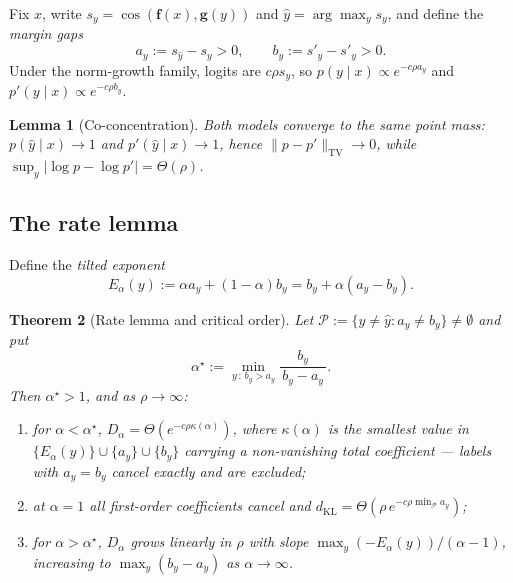 \documentclass[10pt,letterpaper,twocolumn]{article}
\newcommand{\bff}{\mathbf{f}}
\newcommand{\bfg}{\mathbf{g}}
\newcommand{\dKL}{d_{\mathrm{KL}}}
\newcommand{\Dalpha}{D_{\alpha}}
\newcommand{\TV}{\mathrm{TV}}
\theoremstyle{plain}
\newtheorem{theorem}{Theorem}
\newtheorem{lemma}[theorem]{Lemma}
\theoremstyle{definition}
\theoremstyle{remark}
\begin{document}
Fix $x$, write $s_{y}=\cos(\bff(x),\bfg(y))$ and
$\hat y=\arg\max_{y}s_{y}$, and define the \emph{margin gaps}
\begin{equation}
a_{y}:=s_{\hat y}-s_{y}>0,\qquad b_{y}:=s'_{\hat y}-s'_{y}>0 .
\label{eq:gaps}
\end{equation}
Under the norm-growth family, logits are $c\rho s_{y}$, so
$p(y\mid x)\propto e^{-c\rho a_{y}}$ and $p'(y\mid x)\propto e^{-c\rho b_{y}}$.

\begin{lemma}[Co-concentration]
\label{lem:coconc}
Both models converge to the \emph{same} point mass:
$p(\hat y\mid x)\to1$ and $p'(\hat y\mid x)\to1$, hence
$\|p-p'\|_{\TV}\to0$, while
$\sup_{y}|\log p-\log p'|=\Theta(\rho)$.
\end{lemma}

\subsection{The rate lemma}

Define the \emph{tilted exponent}
\begin{equation}
E_{\alpha}(y):=\alpha a_{y}+(1-\alpha)b_{y}=b_{y}+\alpha(a_{y}-b_{y}).
\label{eq:tilted}
\end{equation}

\begin{theorem}[Rate lemma and critical order]
\label{thm:alphastar}
Let $\mathcal{P}:=\{y\neq\hat y: a_{y}\neq b_{y}\}\neq\emptyset$ and put
\begin{equation}
\alpha^{\star}:=\min_{y\,:\,b_{y}>a_{y}}\frac{b_{y}}{\,b_{y}-a_{y}\,}.
\label{eq:alphastar}
\end{equation}
Then $\alpha^{\star}>1$, and as $\rho\to\infty$:
\begin{enumerate}[label=(\roman*),leftmargin=1.6em,itemsep=1pt,topsep=2pt]
\item for $\alpha<\alpha^{\star}$,
      $\Dalpha=\Theta(e^{-c\rho\kappa(\alpha)})$, where $\kappa(\alpha)$ is the
      smallest value in $\{E_{\alpha}(y)\}\cup\{a_{y}\}\cup\{b_{y}\}$ carrying a
      non-vanishing total coefficient --- labels with $a_{y}=b_{y}$ cancel
      exactly and are excluded;
\item at $\alpha=1$ all first-order coefficients cancel and
      $\dKL=\Theta(\rho\,e^{-c\rho\min_{\mathcal{P}}a_{y}})$;
\item for $\alpha>\alpha^{\star}$, $\Dalpha$ grows \emph{linearly} in $\rho$
      with slope $\max_{y}(-E_{\alpha}(y))/(\alpha-1)$, increasing to
      $\max_{y}(b_{y}-a_{y})$ as $\alpha\to\infty$.
\end{enumerate}
\end{theorem}
\end{document}

